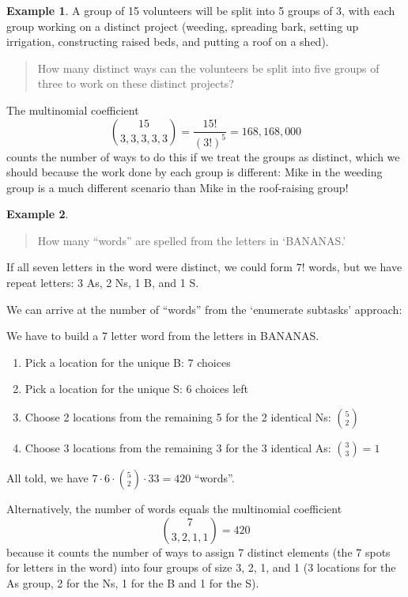 \documentclass[
]{book}
\providecommand{\tightlist}{%
  \setlength{\itemsep}{0pt}\setlength{\parskip}{0pt}}
\theoremstyle{definition}
\theoremstyle{definition}
\newtheorem{example}{Example}[chapter]
\theoremstyle{definition}
\theoremstyle{definition}
\theoremstyle{remark}
\begin{document}
\begin{example}
\protect\hypertarget{exm:Break-group-into-5}{}\label{exm:Break-group-into-5}A group of 15 volunteers will be split into 5 groups of 3, with each group working on a distinct project (weeding, spreading bark, setting up irrigation, constructing raised beds, and putting a roof on a shed).

\begin{quote}
How many distinct ways can the volunteers be split into five groups of three to work on these distinct projects?
\end{quote}

The multinomial coefficient
\[\binom{15}{3, 3, 3, 3, 3} = \frac{15!}{(3!)^5} = 168,168,000\]
counts the number of ways to do this if we treat the groups as distinct, which we should because the work done by each group is different: Mike in the weeding group is a much different scenario than Mike in the roof-raising group!
\end{example}

\begin{example}
\protect\hypertarget{exm:bananas}{}\label{exm:bananas}\leavevmode

\begin{quote}
How many ``words'' are spelled from the letters in `BANANAS.'
\end{quote}

If all seven letters in the word were distinct, we could form \(7!\) words, but we have repeat letters: 3 As, 2 Ns, 1 B, and 1 S.

We can arrive at the number of ``words'' from the `enumerate subtasks' approach:

We have to build a 7 letter word from the letters in BANANAS.

\begin{enumerate}
\def\labelenumi{\arabic{enumi}.}
\tightlist
\item
  Pick a location for the unique B: 7 choices
\item
  Pick a location for the unique S: 6 choices left
\item
  Choose 2 locations from the remaining 5 for the 2 identical Ns: \(\binom{5}{2}\)
\item
  Choose 3 locations from the remaining 3 for the 3 identical As: \(\binom{3}{3} = 1\)
\end{enumerate}

All told, we have \(7 \cdot 6 \cdot \binom{5}{2} \cdot {3}{3} = 420\) ``words''.

Alternatively, the number of words equals the multinomial coefficient \[\binom{7}{3, 2, 1, 1} = 420\] because it counts the number of ways to assign 7 distinct elements (the 7 spots for letters in the word) into four groups of size 3, 2, 1, and 1 (3 locations for the As group, 2 for the Ns, 1 for the B and 1 for the S).

\end{example}
\end{document}
